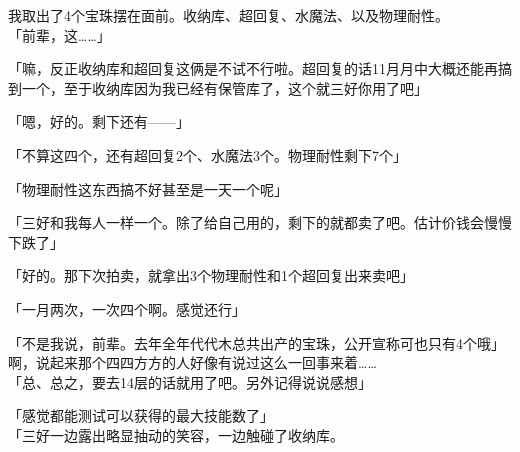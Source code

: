 我取出了4个宝珠摆在面前。收纳库、超回复、水魔法、以及物理耐性。\\

「前辈，这……」

「嘛，反正收纳库和超回复这俩是不试不行啦。超回复的话11月月中大概还能再搞到一个，至于收纳库因为我已经有保管库了，这个就三好你用了吧」

「嗯，好的。剩下还有——」

「不算这四个，还有超回复2个、水魔法3个。物理耐性剩下7个」

「物理耐性这东西搞不好甚至是一天一个呢」

「三好和我每人一样一个。除了给自己用的，剩下的就都卖了吧。估计价钱会慢慢下跌了」

「好的。那下次拍卖，就拿出3个物理耐性和1个超回复出来卖吧」

「一月两次，一次四个啊。感觉还行」

「不是我说，前辈。去年全年代代木总共出产的宝珠，公开宣称可也只有4个哦」\\

啊，说起来那个四四方方的人好像有说过这么一回事来着……\\

「总、总之，要去14层的话就用了吧。另外记得说说感想」

「感觉都能测试可以获得的最大技能数了」\\

「三好一边露出略显抽动的笑容，一边触碰了收纳库。\\

